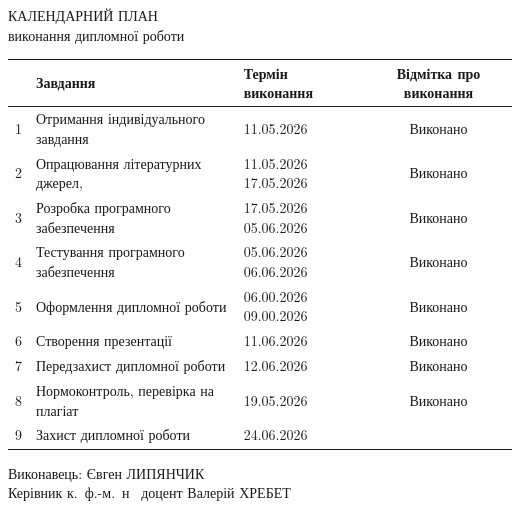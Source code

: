 	\clearpage
	
	
	{ \centering \large
		\MakeUppercase{календарний план}\\
		\normalsize
		виконання дипломної роботи\\
	}
	
	\begin{table}[h!]
		\centering \small
		\begin{tabular}{|c|p{8cm}|p{2cm}|c|}
			\hline
			\textnumero & Завдання & Термін \newline виконання & Відмітка про виконання \\
			\hline
			1 & Отримання індивідуального завдання & 11.05.2026 & Виконано \\
			\hline
			2 & Опрацювання літературних джерел, & 11.05.2026 17.05.2026 & Виконано\\
			\hline
			3 & Розробка програмного забезпечення & 17.05.2026 05.06.2026 & Виконано\\
			\hline
			4 & Тестування програмного забезпечення & 05.06.2026 06.06.2026 & Виконано\\
			\hline
			5 & Оформлення дипломної роботи & 06.00.2026 09.00.2026 & Виконано\\
			\hline
			6 & Створення презентації & 11.06.2026 & Виконано\\
			\hline
			7 & Передзахист дипломної роботи & 12.06.2026 & Виконано\\
			\hline
			8 & Нормоконтроль, перевірка на плагіат & 19.05.2026 & Виконано\\
			\hline
			9 & Захист дипломної роботи & 24.06.2026 & \\
			\hline
		\end{tabular}
	\end{table}
	\vfill
	\begin{center}
		Виконавець: \hfill Євген ЛИПЯНЧИК\\
		Керівник \hfill к.~ф.-м.~н~ доцент Валерій ХРЕБЕТ\\
	\end{center}
	\vfill
%